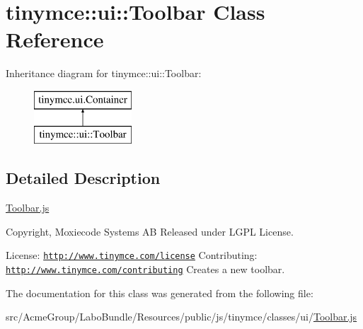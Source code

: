 \hypertarget{classtinymce_1_1ui_1_1_toolbar}{\section{tinymce\+:\+:ui\+:\+:Toolbar Class Reference}
\label{classtinymce_1_1ui_1_1_toolbar}
}
Inheritance diagram for tinymce\+:\+:ui\+:\+:Toolbar\+:\begin{figure}[H]
\begin{center}
\leavevmode
\includegraphics[height=2.000000cm]{classtinymce_1_1ui_1_1_toolbar}
\end{center}
\end{figure}


\subsection{Detailed Description}
\hyperlink{_toolbar_8js}{Toolbar.\+js}

Copyright, Moxiecode Systems A\+B Released under L\+G\+P\+L License.

License\+: \href{http://www.tinymce.com/license}{\tt http\+://www.\+tinymce.\+com/license} Contributing\+: \href{http://www.tinymce.com/contributing}{\tt http\+://www.\+tinymce.\+com/contributing} Creates a new toolbar. 

The documentation for this class was generated from the following file\+:\begin{DoxyCompactItemize}
\item 
src/\+Acme\+Group/\+Labo\+Bundle/\+Resources/public/js/tinymce/classes/ui/\hyperlink{_toolbar_8js}{Toolbar.\+js}\end{DoxyCompactItemize}

